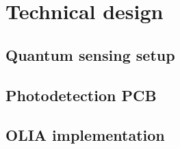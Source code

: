 \chapter{Technical design} \label{chap:tech_design}
\section{Quantum sensing setup}
\section{Photodetection PCB}
\section{OLIA implementation}
